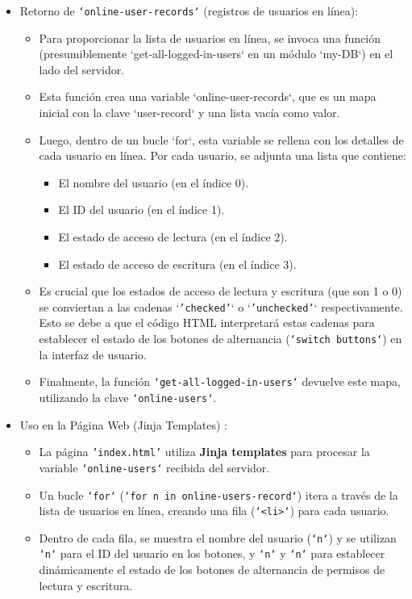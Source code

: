\documentclass{report}
\begin{document}
\begin{itemize}
    \item Retorno de \texttt{`online-user-records`} (registros de usuarios en línea):
        \begin{itemize}
            \item Para proporcionar la lista de usuarios en línea, se invoca una función (presumiblemente `get-all-logged-in-users` en un módulo `my-DB`) 
            en el lado del servidor.
            \item Esta función crea una variable `online-user-records`, que es un mapa inicial con la clave `user-record` y una lista vacía como valor.
            \item Luego, dentro de un bucle `for`, esta variable se  rellena  con los detalles de cada usuario en línea. Por cada usuario, se adjunta una 
            lista que contiene:
                \begin{itemize}
                    \item El nombre del usuario (en el índice 0).
                    \item El ID del usuario (en el índice 1).
                    \item El estado de acceso de lectura (en el índice 2).
                    \item El estado de acceso de escritura (en el índice 3).                
                \end{itemize}
            \item Es crucial que los estados de acceso de lectura y escritura (que son 1 o 0) se conviertan a las cadenas `\texttt{'checked'}` o 
            `\texttt{'unchecked'}` respectivamente. Esto se debe a que el código HTML interpretará estas cadenas para establecer el estado de los botones 
            de alternancia (\texttt{`switch buttons`}) en la interfaz de usuario.
            \item Finalmente, la función \texttt{`get-all-logged-in-users`} devuelve este mapa, utilizando la clave \texttt{`online-users`}.
        \end{itemize}

    \item Uso en la Página Web (Jinja Templates) :
        \begin{itemize}
            \item La página \texttt{'index.html'} utiliza \textbf{Jinja templates} para procesar la variable \texttt{`online-users`} recibida del servidor.
            \item Un bucle \texttt{`for`} (\texttt{`for n in online-users-record`}) itera a través de la lista de usuarios en línea, creando una fila 
            (\texttt{`<li>`}) para cada usuario.
            \item Dentro de cada fila, se muestra el nombre del usuario (\texttt{`n`}) y se utilizan \texttt{`n`} para el ID del usuario en los botones, y
            \texttt{`n`} y \texttt{`n`} para establecer dinámicamente el estado de los botones de alternancia de permisos de lectura y escritura.
        \end{itemize}
\end{itemize}
\end{document}
